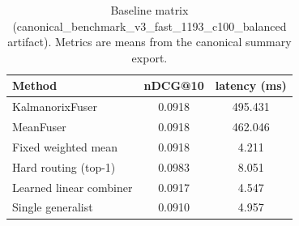 \begin{table}[t]
\centering
\caption{Baseline matrix (canonical\_benchmark\_v3\_fast\_1193\_c100\_balanced artifact). Metrics are means from the canonical summary export.}
\label{tab:baseline-matrix}
\begin{tabular}{lcc}
\toprule
Method & nDCG@10 & latency (ms) \\
\midrule
KalmanorixFuser & 0.0918 & 495.431 \\
MeanFuser & 0.0918 & 462.046 \\
Fixed weighted mean & 0.0918 & 4.211 \\
Hard routing (top-1) & 0.0983 & 8.051 \\
Learned linear combiner & 0.0917 & 4.547 \\
Single generalist & 0.0910 & 4.957 \\
\bottomrule
\end{tabular}
\end{table}
